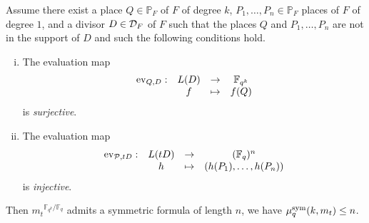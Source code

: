 \documentclass[11pt]{article}
\begin{document}
\begin{prop}
  \label{prop:method}
  Assume there exist a place $Q\in\mathbb{P}_{F}$ of $F$ of degree $k$, $P_1,
  \dots, P_n\in\mathbb{P}_F$ places of $F$ of degree $1$, and a divisor
  $D\in\mathcal{D}_F$ of $F$ such that the places $Q$ and $P_1, \dots, P_n$ are not in
  the support of $D$ and such the following conditions hold.
  \begin{enumerate}[(i)]
    \item \label{cond:1} The evaluation map
      \[
        \begin{array}{cccc}
        \operatorname{ev}_{Q, D}: & L(D) & \to & \mathbb{F}_{q^k}\\
  & f & \mapsto & f(Q)
\end{array}
\]
is \emph{surjective}.
    \item \label{cond:2} The evaluation map
      \[
        \begin{array}{cccc}
        \operatorname{ev}_{\mathcal{P}, tD}: & L(tD) & \to & (\mathbb{F}_{q})^n\\
  & h & \mapsto & (h(P_1), \dots, h(P_n))
\end{array}
\]
is \emph{injective}.
  \end{enumerate}
  Then ${m_t}^{\mathbb{F}_{q^k}/\mathbb{F}_q}$ admits a symmetric formula of length $n$, \ie we have $\mu^{\textrm{sym}}_q(k,m_t)\leq n$.
\end{prop}
\end{document}
